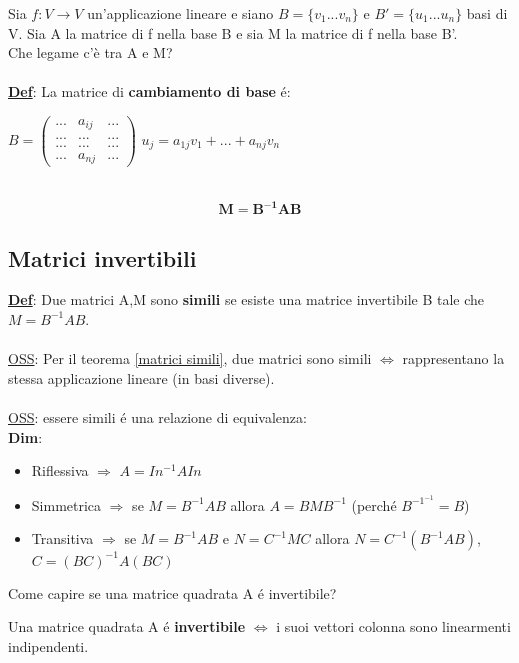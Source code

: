 \documentclass[12pt]{article}
\begin{document}
\noindent Sia $f:V \longrightarrow V$ un'applicazione lineare e siano $B = \{v_1...v_n\}$ e $B' = \{u_1...u_n\}$ basi di V. Sia A la matrice di f nella base B e sia M la matrice di f nella base B'.\\
Che legame c'è tra A e M?\\\\
\underline{\textbf{Def}}: La matrice di \textbf{cambiamento di base} é:

$B = \begin{pmatrix}
    ... & a_{ij} & ...\\
    ... & ...& ...\\
    ... & ... & ...\\
    ... & a_{nj} & ...
\end{pmatrix}$
 $u_j = a_{1j}v_1+...+a_{nj}v_n$\\
\\
\begin{theorem}
    $$\boldsymbol{M = B^{-1}AB}$$

\label{matrici simili}
\end{theorem}
\subsection{Matrici invertibili}
\textbf{\underline{Def}}: Due matrici A,M sono \textbf{simili} se esiste una matrice invertibile B tale che $M = B^{-1}AB$.\\\\
\underline{OSS}: Per il teorema \ref{matrici simili}, due matrici sono simili $\iff$ rappresentano la stessa applicazione lineare (in basi diverse).\\\\
\underline{OSS}: essere simili é una relazione di equivalenza:\\
\textbf{Dim}:
\begin{itemize}
    \item Riflessiva $\Rightarrow$ $A = In^{-1}AIn$
    \item Simmetrica $\Rightarrow$ se $M = B^{-1}AB$ allora $A = BMB^{-1}$ (perché $B^{{-1}^{-1}} = B$)
    \item Transitiva $\Rightarrow$ se $M = B^{-1}AB$ e $N = C^{-1}MC$ allora $N=C^{-1}(B^{-1}AB)$, $C = (BC)^{-1}A(BC)$
\end{itemize}

Come capire se una matrice quadrata A é invertibile?
\begin{theorem}
    Una matrice quadrata A é \textbf{invertibile} $\iff$ i suoi vettori colonna sono linearmenti indipendenti.
    \label{matrici invertibili}
\end{theorem}
\end{document}
